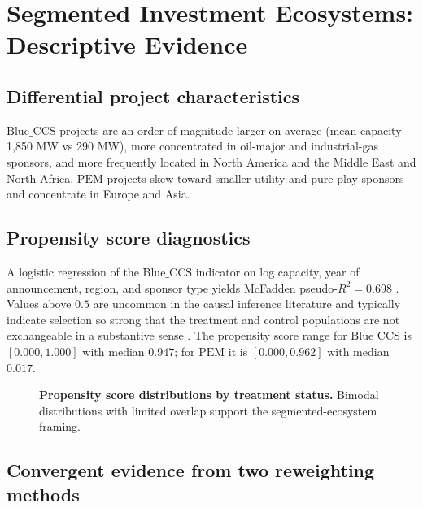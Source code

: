 \documentclass[11pt,a4paper]{article}
\newcommand{\BlueCCS}{\mathrm{Blue\_CCS}}
\newcommand{\PEM}{\mathrm{PEM}}
\begin{document}
\section{Segmented Investment Ecosystems: Descriptive Evidence}

\subsection{Differential project characteristics}

$\BlueCCS$ projects are an order of magnitude larger on average (mean capacity 1{,}850 MW vs 290 MW), more concentrated in oil-major and industrial-gas sponsors, and more frequently located in North America and the Middle East and North Africa. $\PEM$ projects skew toward smaller utility and pure-play sponsors and concentrate in Europe and Asia.

\subsection{Propensity score diagnostics}

A logistic regression of the $\BlueCCS$ indicator on log capacity, year of announcement, region, and sponsor type yields McFadden pseudo-$R^2 = 0.698$ \citep{McFadden1974}. Values above $0.5$ are uncommon in the causal inference literature \citep{ImbensRubin2015} and typically indicate selection so strong that the treatment and control populations are not exchangeable in a substantive sense \citep{RosenbaumRubin1983}. The propensity score range for $\BlueCCS$ is $[0.000, 1.000]$ with median $0.947$; for $\PEM$ it is $[0.000, 0.962]$ with median $0.017$.

\begin{figure}[H]
\centering
\caption{\textbf{Propensity score distributions by treatment status.} Bimodal distributions with limited overlap support the segmented-ecosystem framing.}
\label{fig:ps_density}
\end{figure}

\subsection{Convergent evidence from two reweighting methods}
\end{document}
